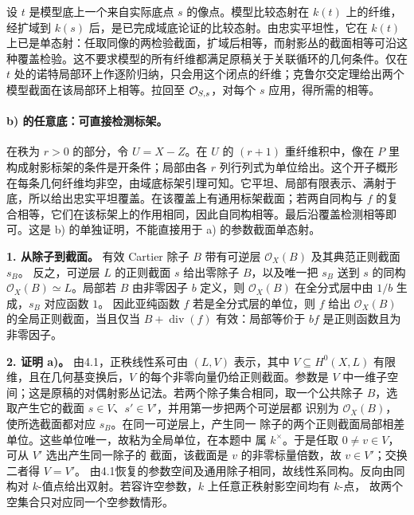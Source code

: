 设 \(t\) 是模型底上一个来自实际底点 \(s\) 的像点。模型比较态射在 \(k(t)\) 上的纤维，经扩域到 \(k(s)\) 后，是已完成域底论证的比较态射。由忠实平坦性，它在 \(k(t)\) 上已是单态射：任取同像的两检验截面，扩域后相等，而射影丛的截面相等可沿这种覆盖检验。这不要求模型的所有纤维都满足原稿关于关联循环的几何条件。仅在 \(t\) 处的诺特局部环上作逐阶归纳，只会用这个闭点的纤维；克鲁尔交定理给出两个模型截面在该局部环上相等。拉回至 \(\OO_{S,s}\)，对每个 \(s\) 应用，得所需的相等。

\paragraph{b) 的任意底：可直接检测标架。}
在秩为 \(r>0\) 的部分，令 \(U=X-Z\)。在 \(U\) 的 \((r+1)\) 重纤维积中，像在 \(P\) 里构成射影标架的条件是开条件；局部由各 \(r\) 列行列式为单位给出。这个开子概形在每条几何纤维均非空，由域底标架引理可知。它平坦、局部有限表示、满射于底，所以给出忠实平坦覆盖。在该覆盖上有通用标架截面；若两自同构与 \(f\) 的复合相等，它们在该标架上的作用相同，因此自同构相等。最后沿覆盖检测相等即可。这是 b) 的单独证明，不能直接用于 a) 的参数截面单态射。
\par\endgroup

\begingroup
\def\Div{\operatorname{div}}
\def\Ens{\operatorname{Ens}}
\def\OO{\mathcal O}
\def\KK{\mathcal K}
\def\PP{\mathbf P}
\hypertarget{audit:L18-085}{}
\noindent\textbf{1. 从除子到截面。}
有效 Cartier 除子 \(B\) 带有可逆层 \(\OO_X(B)\) 及其典范正则截面 \(s_B\)。
反之，可逆层 \(L\) 的正则截面 \(s\) 给出零除子 \(B\)，以及唯一把 \(s_B\)
送到 \(s\) 的同构 \(\OO_X(B)\simeq L\)。局部若 \(B\) 由非零因子 \(b\)
定义，则 \(\OO_X(B)\) 在全分式层中由 \(1/b\) 生成，\(s_B\) 对应函数 \(1\)。
因此亚纯函数 \(f\) 若是全分式层的单位，则 \(f\) 给出 \(\OO_X(B)\)
的全局正则截面，当且仅当 \(B+\Div(f)\) 有效：局部等价于 \(bf\)
是正则函数且为非零因子。

\medskip\noindent\textbf{2. 证明 a)。}
由4.1，正秩线性系可由 \((L,V)\) 表示，其中 \(V\subseteq H^0(X,L)\)
有限维，且在几何基变换后，\(V\) 的每个非零向量仍给正则截面。参数是 \(V\)
中一维子空间；这是原稿的对偶射影丛记法。若两个除子集合相同，取一个公共除子
\(B\)，选取产生它的截面 \(s\in V\)、\(s'\in V'\)，并用第一步把两个可逆层都
识别为 \(\OO_X(B)\)，使所选截面都对应 \(s_B\)。在同一可逆层上，产生同一
除子的两个正则截面局部相差单位。这些单位唯一，故粘为全局单位，在本题中
属 \(k^\times\)。于是任取 \(0\ne v\in V\)，可从 \(V'\) 选出产生同一除子的
截面，该截面是 \(v\) 的非零标量倍数，故 \(v\in V'\)；交换二者得 \(V=V'\)。
由4.1恢复的参数空间及通用除子相同，故线性系同构。反向由同构对
\(k\)-值点给出双射。若容许空参数，\(k\) 上任意正秩射影空间均有 \(k\)-点，
故两个空集合只对应同一个空参数情形。

